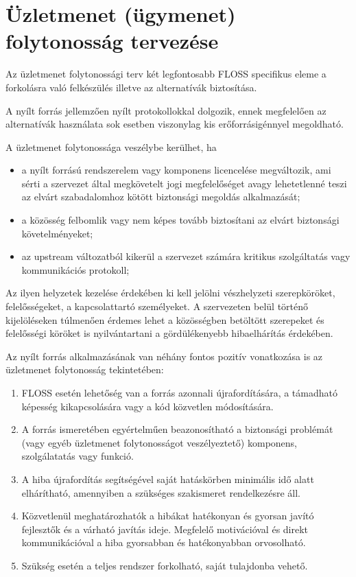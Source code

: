 \documentclass[12pt,magyar,a4paper,oneside]{scrreprt}
\providecommand{\tightlist}{%
  \setlength{\itemsep}{0pt}\setlength{\parskip}{0pt}}
\begin{document}
\hypertarget{uxfczletmenet-uxfcgymenet-folytonossuxe1g-tervezuxe9se}{%
\section{Üzletmenet (ügymenet) folytonosság
tervezése}\label{uxfczletmenet-uxfcgymenet-folytonossuxe1g-tervezuxe9se}}

Az üzletmenet folytonossági terv két legfontosabb FLOSS specifikus eleme
a forkolásra való felkészülés illetve az alternatívák biztosítása.

A nyílt forrás jellemzően nyílt protokollokkal dolgozik, ennek
megfelelően az alternatívák használata sok esetben viszonylag kis
erőforrásigénnyel megoldható.

A üzletmenet folytonossága veszélybe kerülhet, ha

\begin{itemize}
\tightlist
\item
  a nyílt forrású rendszerelem vagy komponens licencelése megváltozik,
  ami sérti a szervezet által megkövetelt jogi megfelelőséget avagy
  lehetetlenné teszi az elvárt szabadalomhoz kötött biztonsági megoldás
  alkalmazását;
\item
  a közösség felbomlik vagy nem képes tovább biztosítani az elvárt
  biztonsági követelményeket;
\item
  az upstream változatból kikerül a szervezet számára kritikus
  szolgáltatás vagy kommunikációs protokoll;
\end{itemize}

Az ilyen helyzetek kezelése érdekében ki kell jelölni vészhelyzeti
szerepköröket, felelősségeket, a kapcsolattartó személyeket. A
szervezeten belül történő kijelöléseken túlmenően érdemes lehet a
közösségben betöltött szerepeket és felelősségi köröket is
nyilvántartani a gördülékenyebb hibaelhárítás érdekében.

Az nyílt forrás alkalmazásának van néhány fontos pozitív vonatkozása is
az üzletmenet folytonosság tekintetében:

\begin{enumerate}
\def\labelenumi{\arabic{enumi}.}
\tightlist
\item
  FLOSS esetén lehetőség van a forrás azonnali újrafordítására, a
  támadható képesség kikapcsolására vagy a kód közvetlen módosítására.
\item
  A forrás ismeretében egyértelműen beazonosítható a biztonsági
  problémát (vagy egyéb üzletmenet folytonosságot veszélyeztető)
  komponens, szolgálatatás vagy funkció.
\item
  A hiba újrafordítás segítségével saját hatáskörben minimális idő alatt
  elhárítható, amennyiben a szükséges szakismeret rendelkezésre áll.
\item
  Közvetlenül meghatározhatók a hibákat hatékonyan és gyorsan javító
  fejlesztők és a várható javítás ideje. Megfelelő motivációval és
  direkt kommunikációval a hiba gyorsabban és hatékonyabban orvosolható.
\item
  Szükség esetén a teljes rendszer forkolható, saját tulajdonba vehető.
\end{enumerate}
\end{document}
